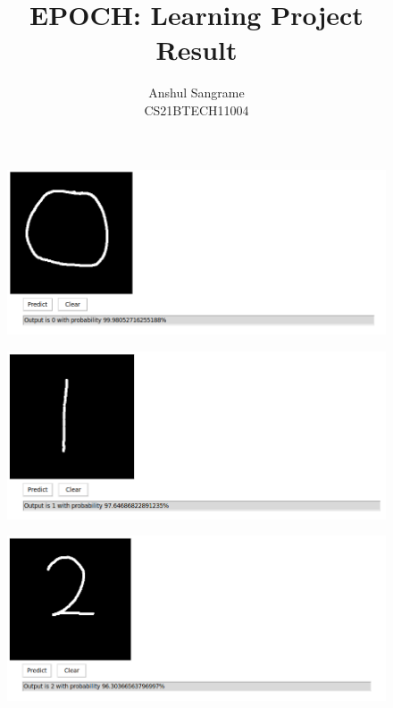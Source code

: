 \documentclass[letterpaper]{article}
\title{EPOCH: Learning Project \\ \large Result}
\author{Anshul Sangrame \\ CS21BTECH11004}
\date{}
\begin{document}
\maketitle

\begin{large}

    \begin{figure}[!ht]
        \centering
        \includegraphics[scale = 0.5]{../figs/0.png}
    \end{figure}

    \begin{figure}[!ht]
        \centering
        \includegraphics[scale = 0.5]{../figs/1.png}
    \end{figure}

    \begin{figure}[!ht]
        \centering
        \includegraphics[scale = 0.5]{../figs/2.png}
    \end{figure}


\end{large}
\end{document}
